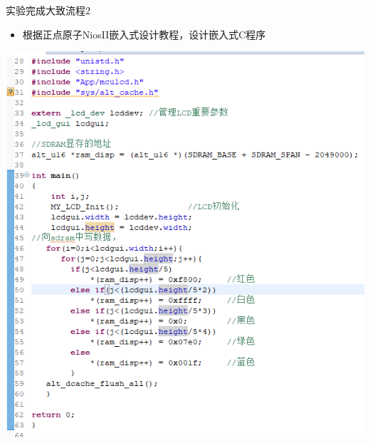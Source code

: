 \documentclass{beamer}
\begin{document}
\begin{frame}{实验完成大致流程2}
    \begin{itemize}[<+-| alert@+>]
        \item 根据正点原子NiosII嵌入式设计教程，设计嵌入式C程序
     \end{itemize}
     \pause
    \centering
    \includegraphics[width=1\textwidth]{pic/003.png}
    \label{fig:system_block_diagram}

\end{frame}
\end{document}
